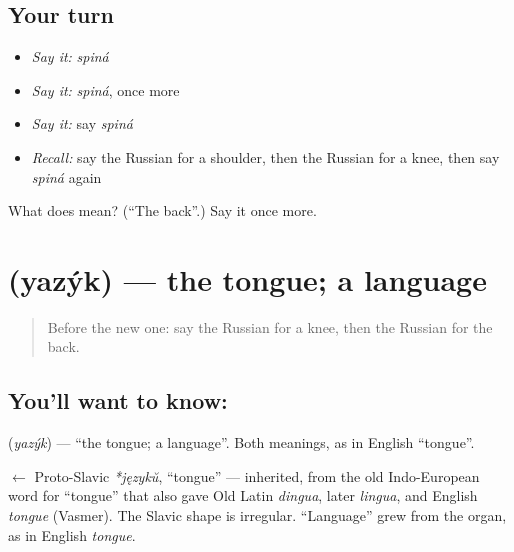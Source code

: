 \subsection*{Your turn}
\begin{itemize}
\raggedright
  \item \emph{Say it:} \emph{spiná}
  \item \emph{Say it:} \emph{spiná}, once more
  \item \emph{Say it:} say \emph{spiná}
  \item \emph{Recall:} say the Russian for a shoulder, then the Russian for a knee, then say \emph{spiná} again
\end{itemize}

\begin{tcolorbox}[breakable,colback=teal!4,colframe=teal!35!black,title={Before you move on}]
What does  mean? (\textquotedblleft{}The back\textquotedblright{}.) Say it once more.
\end{tcolorbox}
\section[\texorpdfstring{\ru{язык} (yazýk)}{язык (yazýk)}]{ (yazýk) — the tongue; a language}

\label{lesson:RU-C31-tongue}



\begin{quote}
Before the new one: say the Russian for a knee, then the Russian for the back.
\end{quote}

\subsection*{You'll want to know: }
\textbf{} (\emph{yazýk}) — \textquotedblleft{}the tongue; a language\textquotedblright{}. Both meanings, as in English \textquotedblleft{}tongue\textquotedblright{}.

\begin{cousinweb}
\textbf{} $\leftarrow$ Proto-Slavic \emph{*językŭ}, \textquotedblleft{}tongue\textquotedblright{} — inherited, from the old Indo-European word for \textquotedblleft{}tongue\textquotedblright{} that also gave Old Latin \emph{dingua}, later \emph{lingua}, and English \emph{tongue} (Vasmer). The Slavic shape is irregular. \textquotedblleft{}Language\textquotedblright{} grew from the organ, as in English \emph{tongue}.
\end{cousinweb}

